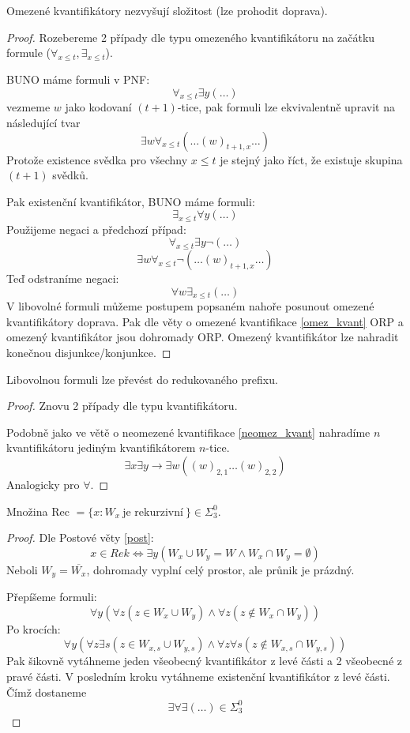 \begin{theorem}
	Omezené kvantifikátory nezvyšují složitost (lze prohodit doprava).
\end{theorem}
\begin{proof}
	Rozebereme 2 případy dle typu omezeného kvantifikátoru na začátku formule ($\forall_{x \leq t}, \exists_{x \leq t}$).

	BUNO máme formuli v PNF:
	\[ \forall_{x \leq t} \exists y (\ldots) \]
	vezmeme $w$ jako kodovaní $(t + 1)$-tice, pak formuli lze ekvivalentně upravit na následující tvar
	\[ \exists w \forall_{x \leq t}(\ldots (w)_{t + 1, x} \ldots)\]
	Protože existence svědka pro všechny $x \leq t$ je stejný jako říct, že existuje skupina $(t + 1)$ svědků.

	Pak existenční kvantifikátor, BUNO máme formuli:
	\[ \exists_{x \leq t} \forall y (\ldots) \]
	Použijeme negaci a předchozí případ:
	\[ \forall_{x \leq t} \exists y \neg(\ldots) \]
	\[ \exists w \forall_{x \leq t}\neg(\ldots (w)_{t + 1, x} \ldots)\]
	Teď odstraníme negaci:
	\[ \forall w \exists_{x \leq t} (\ldots)\]
	V libovolné formuli můžeme postupem popsaném nahoře posunout omezené kvantifikátory doprava.
	Pak dle věty o omezené kvantifikace \cref{omez_kvant} ORP a omezený kvantifikátor jsou dohromady ORP.
	Omezený kvantifikátor lze nahradit konečnou disjunkce/konjunkce.

\end{proof}

\begin{theorem}
	Libovolnou formuli lze převést do redukovaného prefixu.
\end{theorem}
\begin{proof}
	Znovu 2 případy dle typu kvantifikátoru.

	Podobně jako ve větě o neomezené kvantifikace \cref{neomez_kvant} nahradíme $n$ kvantifikátoru jediným kvantifikátorem $n$-tice.
	\[ \exists x \exists y \to \exists w ((w)_{2, 1} \ldots  (w)_{2, 2}) \]
	Analogicky pro $\forall$.
\end{proof}

\begin{example}
	Množina Rec $= \{ x : W_x\ \text{je rekurzivní}\ \} \in \Sigma_3^0$.
\end{example}
\begin{proof}
	Dle Postové věty \cref{post}:
	\[ x \in Rek \iff \exists y(W_x \cup W_y = W \land W_x \cap W_y = \emptyset) \]
	Neboli $W_y = \overline{W_x}$, dohromady vyplní celý prostor, ale průnik je prázdný.

	Přepíšeme formuli:
	\[ \forall y(\forall z (z \in W_x \cup W_y) \land \forall z (z \notin W_x \cap W_y)) \]
	Po krocích:
	\[ \forall y(\forall z \exists s(z \in W_{x, s} \cup W_{y, s}) \land \forall z \forall s(z \notin W_{x, s} \cap W_{y, s})) \]
	Pak šikovně vytáhneme jeden všeobecný kvantifikátor z levé části a 2 všeobecné z pravé části.
	V posledním kroku vytáhneme existenční kvantifikátor z levé části. Čímž dostaneme
	\[ \exists \forall \exists (\ldots) \in \Sigma_3^0 \]
\end{proof}

